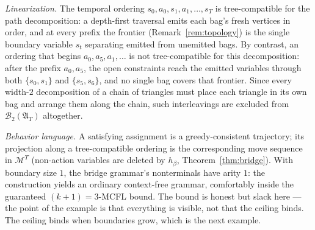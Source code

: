 \documentclass[runningheads]{llncs}
\begin{document}
\begin{example}
\emph{Linearization.} The temporal ordering $s_0, a_0, s_1, a_1, \ldots, s_T$ is tree-compatible for the path decomposition: a depth-first traversal emits each bag's fresh vertices in order, and at every prefix the frontier (Remark~\ref{rem:topology}) is the single boundary variable $s_t$ separating emitted from unemitted bags. By contrast, an ordering that begins $a_0, a_5, a_1, \ldots$ is not tree-compatible for this decomposition: after the prefix $a_0, a_5$, the open constraints reach the emitted variables through both $\{s_0, s_1\}$ and $\{s_5, s_6\}$, and no single bag covers that frontier. Since every width-$2$ decomposition of a chain of triangles must place each triangle in its own bag and arrange them along the chain, such interleavings are excluded from $\mathcal{B}_2(\mathfrak{A}_T)$ altogether.

\emph{Behavior language.} A satisfying assignment is a greedy-consistent trajectory; its projection along a tree-compatible ordering is the corresponding move sequence in $\mathcal{M}^{T}$ (non-action variables are deleted by $h_\beta$, Theorem~\ref{thm:bridge}). With boundary size $1$, the bridge grammar's nonterminals have arity $1$: the construction yields an ordinary context-free grammar, comfortably inside the guaranteed $(k{+}1) = 3$-MCFL bound. The bound is honest but slack here --- the point of the example is that everything is visible, not that the ceiling binds. The ceiling binds when boundaries grow, which is the next example.
\end{example}
\end{document}
